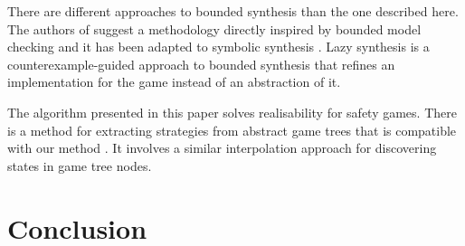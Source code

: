 \documentclass{llncs}
\begin{document}
There are different approaches to bounded synthesis than the one described
here. The authors of \cite{finkbeiner2013} suggest a methodology directly
inspired by bounded model checking and it has been adapted to symbolic
synthesis \cite{ehlers2010}. Lazy synthesis \cite{finkbeiner2012} is a
counterexample-guided approach to bounded synthesis that refines an
implementation for the game instead of an abstraction of it.

The algorithm presented in this paper solves realisability for safety games.
There is a method for extracting strategies from abstract game trees that is
compatible with our method \cite{een2015}. It involves a similar interpolation
approach for discovering states in game tree nodes.

\section{Conclusion}




\end{document}
